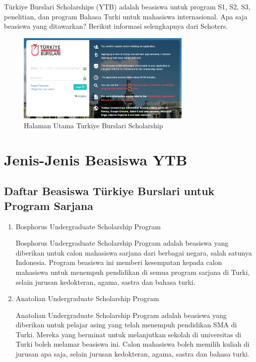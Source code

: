 Türkiye Burslari Scholarships (YTB) adalah beasiswa untuk program S1, S2, S3, penelitian, dan program Bahasa Turki untuk mahasiswa internasional. Apa saja beasiswa yang ditawarkan? Berikut informasi selengkapnya dari Schoters.
\begin{figure}[!htbp]
	\centerline{\includegraphics[width=0.75\textwidth]{figures/1/main_page.PNG}}
	\caption{Halaman Utama Turkiye Burslari Scholarship}
	\label{fig1:main_page}
\end{figure}

\section{Jenis-Jenis Beasiswa YTB}

\subsection{Daftar Beasiswa Türkiye Burslari untuk Program Sarjana}

\begin{enumerate}
\item Bosphorus Undergraduate Scholarship Program

Bosphorus Undergraduate Scholarship Program adalah beasiswa yang diberikan untuk calon mahasiswa sarjana dari berbagai negara, salah satunya Indonesia. Program beasiswa ini memberi kesempatan kepada calon mahasiswa untuk menempuh pendidikan di semua program sarjana di Turki, selain jurusan kedokteran, agama, sastra dan bahasa turki.

\item Anatolian Undergraduate Scholarship Program

Anatolian Undergraduate Scholarship Program adalah beasiswa yang diberikan untuk pelajar asing yang telah menempuh pendidikan SMA di Turki. Mereka yang berminat untuk melanjutkan sekolah di universitas di Turki boleh melamar beasiswa ini. Calon mahasiswa boleh memilih kuliah di jurusan apa saja, selain jurusan kedokteran, agama, sastra dan bahasa turki.
\end{enumerate}

